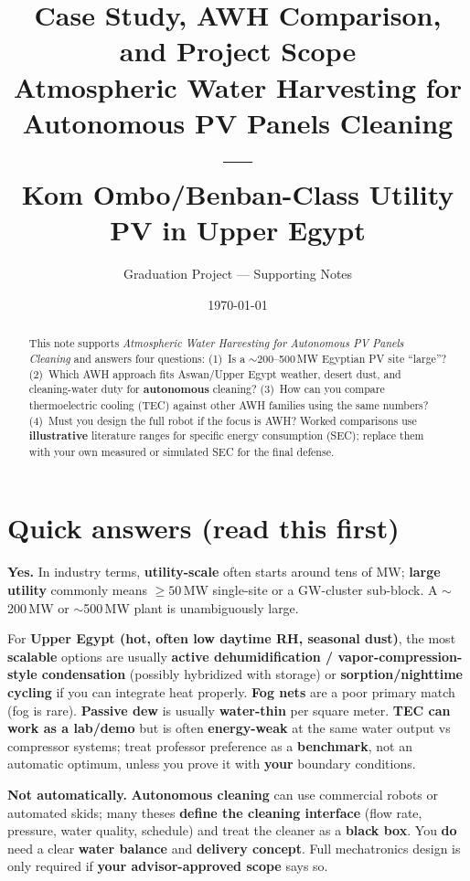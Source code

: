 \documentclass[11pt,a4paper]{article}
\title{\textbf{Case Study, AWH Comparison, and Project Scope}\\
\large Atmospheric Water Harvesting for Autonomous PV Panels Cleaning ---\\
Kom Ombo/Benban-Class Utility PV in Upper Egypt}
\author{Graduation Project --- Supporting Notes}
\date{\today}
\begin{document}
\maketitle

\begin{abstract}
\noindent
This note supports \textit{Atmospheric Water Harvesting for Autonomous PV Panels Cleaning} and answers four questions: (1)~Is a $\sim$200--500\,MW Egyptian PV site ``large''? (2)~Which AWH approach fits Aswan/Upper Egypt weather, desert dust, and cleaning-water duty for \textbf{autonomous} cleaning? (3)~How can you compare thermoelectric cooling (TEC) against other AWH families using the same numbers? (4)~Must you design the full robot if the focus is AWH? Worked comparisons use \textbf{illustrative} literature ranges for specific energy consumption (SEC); replace them with your own measured or simulated SEC for the final defense.
\end{abstract}

\tableofcontents
\newpage

\section{Quick answers (read this first)}
\begin{description}[style=nextline]
  \item[Is $\sim$200--500\,MW ``large''?] \textbf{Yes.} In industry terms, \textbf{utility-scale} often starts around tens of MW; \textbf{large utility} commonly means $\geq 50$\,MW single-site or a GW-cluster sub-block. A $\sim$200\,MW or $\sim$500\,MW plant is unambiguously large.
  \item[Best harvest method here?] For \textbf{Upper Egypt (hot, often low daytime RH, seasonal dust)}, the most \textbf{scalable} options are usually \textbf{active dehumidification / vapor-compression-style condensation} (possibly hybridized with storage) or \textbf{sorption/nighttime cycling} if you can integrate heat properly. \textbf{Fog nets} are a poor primary match (fog is rare). \textbf{Passive dew} is usually \textbf{water-thin} per square meter. \textbf{TEC can work as a lab/demo} but is often \textbf{energy-weak} at the same water output vs compressor systems; treat professor preference as a \textbf{benchmark}, not an automatic optimum, unless you prove it with \textbf{your} boundary conditions.
  \item[Do you have to design robots?] \textbf{Not automatically.} \textbf{Autonomous cleaning} can use commercial robots or automated skids; many theses \textbf{define the cleaning interface} (flow rate, pressure, water quality, schedule) and treat the cleaner as a \textbf{black box}. You \textbf{do} need a clear \textbf{water balance} and \textbf{delivery concept}. Full mechatronics design is only required if \textbf{your advisor-approved scope} says so.
\end{description}
\end{document}
